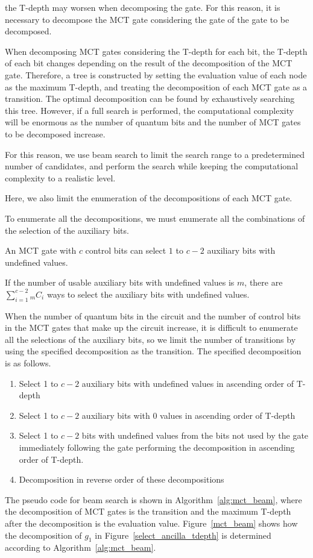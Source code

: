 the T-depth may worsen when decomposing the  gate.
For this reason, it is necessary to decompose the MCT gate considering the  gate of the gate to be decomposed.
\par
When decomposing MCT gates considering the T-depth for each bit,
the T-depth of each bit changes depending on the result of the decomposition of the MCT gate.
Therefore, a tree is constructed by setting the evaluation value of each node as the maximum T-depth,
and treating the decomposition of each MCT gate as a transition.
The optimal decomposition can be found by exhaustively searching this tree.
However, if a full search is performed, the computational complexity will be enormous as the number of quantum bits and the number of MCT gates to be decomposed increase.

For this reason, we use beam search \cite{bisiani1992beam} to limit the search range to a predetermined number of candidates,
and perform the search while keeping the computational complexity to a realistic level.

Here, we also limit the enumeration of the decompositions of each MCT gate.

To enumerate all the decompositions, we must enumerate all the combinations of the selection of the auxiliary bits.

An MCT gate with $c$ control bits can select $1$ to $c-2$ auxiliary bits with undefined values.

If the number of usable auxiliary bits with undefined values is $m$,
there are $\sum_{i = 1}^{c-2} {}_mC_{i}$ ways to select the auxiliary bits with undefined values.

When the number of quantum bits in the circuit and the number of control bits in the MCT gates that make up the circuit increase,
it is difficult to enumerate all the selections of the auxiliary bits,
so we limit the number of transitions by using the specified decomposition as the transition.
The specified decomposition is as follows.
\begin{enumerate}[(1)]
\item Select 1 to $c-2$ auxiliary bits with undefined values in ascending order of T-depth
\item Select 1 to $c-2$ auxiliary bits with 0 values in ascending order of T-depth
\item Select 1 to $c-2$ bits with undefined values from the bits not used by the gate immediately following the gate performing the decomposition in ascending order of T-depth.
\item Decomposition in reverse order of these decompositions
\end{enumerate}
\par
The pseudo code for beam search is shown in Algorithm~\ref{alg:mct_beam}, where the decomposition of MCT gates is the transition and the maximum T-depth after the decomposition is the evaluation value.
Figure~\ref{mct_beam} shows how the decomposition of $g_{1}$ in Figure~\ref{select_ancilla_tdepth} is determined according to Algorithm~\ref{alg:mct_beam}.

